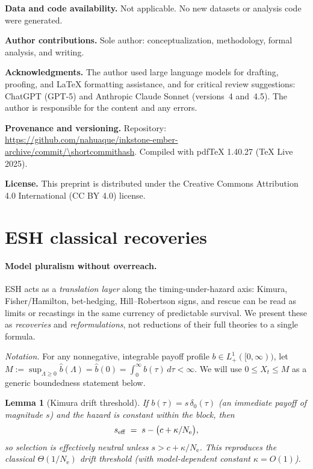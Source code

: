 \documentclass[11pt]{article}
\theoremstyle{upright}
\newtheorem{lemma}{Lemma}
\newcommand{\Ne}{N_{\mathrm{e}}}
\newcommand{\seff}[1][]{s_{\mathrm{eff}\if\relax\detokenize{#1}\relax\else,#1\fi}}
\newcommand{\commiturl}{\url{https://github.com/nahuaque/inkstone-ember-archive/commit/\shortcommithash}}
\begin{document}
\medskip
\noindent\textbf{Data and code availability.}
Not applicable. No new datasets or analysis code were generated.

\medskip
\noindent\textbf{Author contributions.}
Sole author: conceptualization, methodology, formal analysis, and writing.

\medskip
\noindent\textbf{Acknowledgments.}
The author used large language models for drafting, proofing, and \LaTeX{} formatting assistance, and for critical review suggestions: ChatGPT (GPT-5) and Anthropic Claude Sonnet (versions~4 and~4.5). 
The author is responsible for the content and any errors.

\medskip
\noindent\textbf{Provenance and versioning.}
Repository:\\ \commiturl. 
Compiled with pdf\TeX{} 1.40.27 (TeX Live 2025). 

\medskip
\noindent\textbf{License.}
This preprint is distributed under the Creative Commons Attribution 4.0 International (CC BY 4.0) license.

\appendix
{} %

\section{ESH classical recoveries}
\label{sec:unification}

\paragraph{Model pluralism without overreach.}
ESH acts as a \emph{translation layer} along the timing-under-hazard axis: Kimura, Fisher/Hamilton, bet-hedging, Hill–Robertson signs, and rescue can be read as limits or recastings in the same currency of predictable survival. We present these as \emph{recoveries} and \emph{reformulations}, not reductions of their full theories to a single formula.

\noindent\textit{Notation.} For any nonnegative, integrable payoff profile $b\in L^1_+([0,\infty))$,
let $M:=\sup_{\Lambda\ge 0}\widehat b(\Lambda)=\widehat b(0)=\int_0^\infty b(\tau)\,d\tau<\infty$.
We will use $0\le X_t\le M$ as a generic boundedness statement below.

\begin{lemma}[Kimura drift threshold]\label{lem:kimura}
If $b(\tau)=s\,\delta_0(\tau)$ (an immediate payoff of magnitude $s$) and the hazard is constant within the block, then
\[
\seff \;=\; s - \big(c+\kappa/\Ne\big),
\]
so selection is effectively neutral unless $s > c+\kappa/\Ne$. This reproduces the classical $\Theta(1/\Ne)$ drift threshold (with model-dependent constant $\kappa=O(1)$).
\end{lemma}
\end{document}
